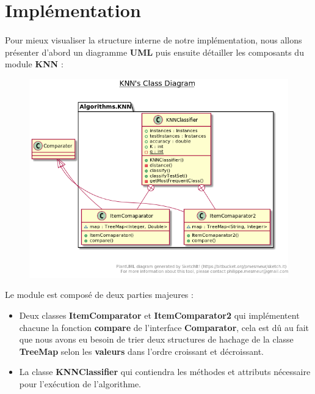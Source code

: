 		
	\section{Implémentation}
		\paragraph{}
		Pour mieux visualiser la structure interne de notre implémentation, nous allons présenter d'abord un diagramme \textbf{UML} puis ensuite détailler les composants du module \textbf{KNN} : 
		\begin{figure}[H]
			\centering
			\includegraphics[width=0.75\linewidth]{knn/images/uml.png}
		\end{figure}
		Le module est composé de deux parties majeures : 
		\begin{itemize}
			\item Deux classes \textbf{ItemComparator} et \textbf{ItemComparator2} qui implémentent chacune la fonction \textbf{compare} de l'interface \textbf{Comparator}, cela est dû au fait que nous avons eu besoin de trier deux structures de hachage de la classe \textbf{TreeMap} selon les \textbf{valeurs} dans l'ordre croissant et décroissant.
			
			\item La classe \textbf{KNNClassifier} qui contiendra les méthodes et attributs nécessaire pour l'exécution de l'algorithme. 
		\end{itemize}
